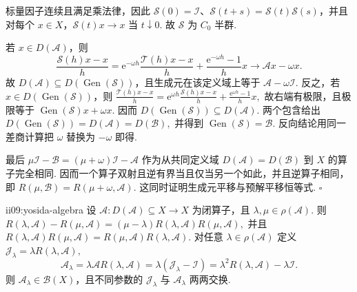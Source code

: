\begin{FAProof}
标量因子连续且满足乘法律，因此 \(\displaystyle\mathcal S(0)=\mathcal I\)、\(\displaystyle\mathcal S(t+s)=\mathcal S(t)\mathcal S(s)\)，并且对每个 \(\displaystyle x\in X\)，\(\displaystyle\mathcal S(t)x\to x\) 当 \(\displaystyle t\downarrow0\). 故 \(\displaystyle\mathcal S\) 为 \(\displaystyle C_0\) 半群.

若 \(\displaystyle x\in D(\mathcal A)\)，则
\[
\frac{\mathcal S(h)x-x}{h}
=
\mathrm{e}^{-\omega h}
\frac{\mathcal T(h)x-x}{h}
+
\frac{\mathrm{e}^{-\omega h}-1}{h}x
\longrightarrow
\mathcal Ax-\omega x.
\]
故 \(\displaystyle D(\mathcal A)\subseteq D(\operatorname{Gen}(\mathcal S))\)，且生成元在该定义域上等于 \(\displaystyle\mathcal A-\omega\mathcal I\). 反之，若 \(\displaystyle x\in D(\operatorname{Gen}(\mathcal S))\)，则 \(\displaystyle \frac{\mathcal T(h)x-x}{h} = \mathrm{e}^{\omega h} \frac{\mathcal S(h)x-x}{h} + \frac{\mathrm{e}^{\omega h}-1}{h}x,\)
故右端有极限，且极限等于 \(\displaystyle\operatorname{Gen}(\mathcal S)x+\omega x\). 因而 \(\displaystyle D(\operatorname{Gen}(\mathcal S))\subseteq D(\mathcal A)\). 两个包含给出 \(\displaystyle D(\operatorname{Gen}(\mathcal S))=D(\mathcal A)=D(\mathcal B),\)
并得到 \(\displaystyle\operatorname{Gen}(\mathcal S)=\mathcal B\). 反向结论用同一差商计算把 \(\displaystyle\omega\) 替换为 \(\displaystyle-\omega\) 即得.

最后 \(\displaystyle \mu\mathcal I-\mathcal B = (\mu+\omega)\mathcal I-\mathcal A\)
作为从共同定义域 \(\displaystyle D(\mathcal A)=D(\mathcal B)\) 到 \(\displaystyle X\) 的算子完全相同. 因而一个算子双射且逆有界当且仅当另一个如此，并且逆算子相同，即 \(\displaystyle R(\mu,\mathcal B)=R(\mu+\omega,\mathcal A).\)
这同时证明生成元平移与预解平移恒等式.
\hfill\(\square\)
\end{FAProof}

\begin{FAProposition}{ii09:yosida-algebra}
设 \(\displaystyle \mathcal A:D(\mathcal A)\subseteq X\to X\)
为闭算子，且 \(\displaystyle\lambda,\mu\in\rho(\mathcal A)\). 则 \(\displaystyle R(\lambda,\mathcal A)-R(\mu,\mathcal A) = (\mu-\lambda)R(\lambda,\mathcal A)R(\mu,\mathcal A),\)
并且 \(\displaystyle R(\lambda,\mathcal A)R(\mu,\mathcal A) = R(\mu,\mathcal A)R(\lambda,\mathcal A).\)
对任意 \(\displaystyle\lambda\in\rho(\mathcal A)\) 定义 \(\displaystyle \mathcal J_\lambda = \lambda R(\lambda,\mathcal A),\)
\[
\mathcal A_\lambda
=
\lambda\mathcal A R(\lambda,\mathcal A)
=
\lambda(\mathcal J_\lambda-\mathcal I)
=
\lambda^2R(\lambda,\mathcal A)-\lambda\mathcal I.
\]
则 \(\displaystyle\mathcal A_\lambda\in\mathcal B(X)\)，且不同参数的 \(\displaystyle\mathcal J_\lambda\) 与 \(\displaystyle\mathcal A_\lambda\) 两两交换.
\end{FAProposition}

